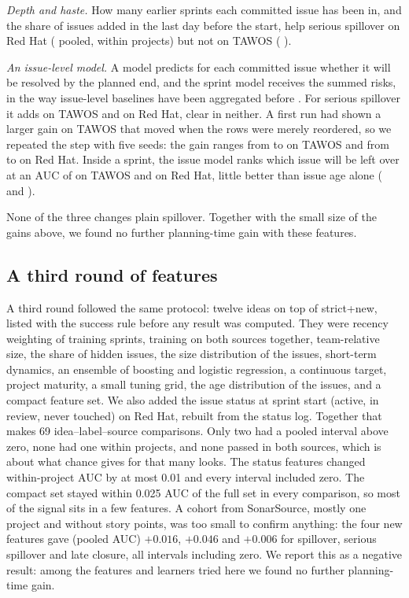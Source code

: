 \documentclass[journal]{IEEEtran}
\begin{document}
\emph{Depth and haste.} How many earlier sprints each committed issue has been in, and the share of issues added in the last day before the start, help serious spillover on Red Hat (\dQRDepSs{} \cQRDepSs{} pooled, \dWRDepSs{} \cWRDepSs{} within projects) but not on TAWOS (\dQTDepSs{} \cQTDepSs).

\emph{An issue-level model.} A model predicts for each committed issue whether it will be resolved by the planned end, and the sprint model receives the summed risks, in the way issue-level baselines have been aggregated before \cite{sprint2vec}. For serious spillover it adds \dQTIssSs{} \cQTIssSs{} on TAWOS and \dQRIssSs{} \cQRIssSs{} on Red Hat, clear in neither. A first run had shown a larger gain on TAWOS that moved when the rows were merely reordered, so we repeated the step with five seeds: the gain ranges from \QSeedMinT{} to \QSeedMaxT{} on TAWOS and from \QSeedMinR{} to \QSeedMaxR{} on Red Hat. Inside a sprint, the issue model ranks which issue will be left over at an AUC of \QRankT{} on TAWOS and \QRankR{} on Red Hat, little better than issue age alone (\QAgeT{} and \QAgeR).

None of the three changes plain spillover. Together with the small size of the gains above, we found no further planning-time gain with these features.

\subsection{A third round of features}
\label{sec:round3}

A third round followed the same protocol: twelve ideas on top of strict+new, listed with the success rule before any result was computed. They were recency weighting of training sprints, training on both sources together, team-relative size, the share of hidden issues, the size distribution of the issues, short-term dynamics, an ensemble of boosting and logistic regression, a continuous target, project maturity, a small tuning grid, the age distribution of the issues, and a compact feature set. We also added the issue status at sprint start (active, in review, never touched) on Red Hat, rebuilt from the status log. Together that makes 69 idea--label--source comparisons. Only two had a pooled interval above zero, none had one within projects, and none passed in both sources, which is about what chance gives for that many looks. The status features changed within-project AUC by at most 0.01 and every interval included zero. The compact set stayed within 0.025 AUC of the full set in every comparison, so most of the signal sits in a few features. A cohort from SonarSource, mostly one project and without story points, was too small to confirm anything: the four new features gave (pooled AUC) $+0.016$, $+0.046$ and $+0.006$ for spillover, serious spillover and late closure, all intervals including zero. We report this as a negative result: among the features and learners tried here we found no further planning-time gain.
\end{document}
